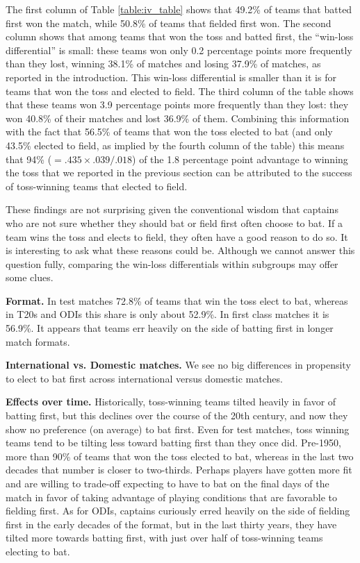 \documentclass[11pt,  letterpaper]{article}
\begin{document}
The first column of Table \ref{table:iv_table} shows that 49.2\% of teams that batted first won the match, while 50.8\% of teams that fielded first won. The second column shows that among teams that won the toss and batted first, the ``win-loss differential'' is small: these teams won only 0.2 percentage points more frequently than they lost, winning 38.1\% of matches and losing 37.9\% of matches, as reported in the introduction. This win-loss differential is smaller than it is for teams that won the toss and elected to field. The third column of the table shows that these teams won 3.9 percentage points more frequently than they lost: they won 40.8\% of their matches and lost 36.9\% of them. Combining this information with the fact that 56.5\% of teams that won the toss elected to bat (and only 43.5\% elected to field, as implied by the fourth column of the table) this means that 94\% ($= .435 \times .039/.018$) of the 1.8 percentage point advantage to winning the toss that we reported in the previous section can be attributed to the success of toss-winning teams that elected to field. 

These findings are not surprising given the conventional wisdom that captains who are not sure whether they should bat or field first often choose to bat. If a team wins the toss and elects to field, they often have a good reason to do so. It is interesting to ask what these reasons could be. Although we cannot answer this question fully, comparing  the win-loss differentials within subgroups may offer some clues. 

\textbf{Format.} In test matches 72.8\% of teams that win the toss elect to bat, whereas in T20s and ODIs this share is only about 52.9\%. In first class matches it is 56.9\%. It appears that teams err heavily on the side of batting first in longer match formats. 

\textbf{International vs. Domestic matches.} We see no big differences in propensity to elect to bat first across international versus domestic matches.

\textbf{Effects over time.} Historically, toss-winning teams tilted heavily in favor of batting first, but this declines over the course of the 20th century, and now they show no preference (on average) to  bat first. Even for test matches, toss winning teams tend to be tilting less toward batting first than they once did. Pre-1950, more than 90\% of teams that won the toss elected to bat, whereas in the last two decades that number is closer to two-thirds. Perhaps players have gotten more fit and are willing to trade-off expecting to have to bat on the final days of the match in favor of taking advantage of playing conditions that are favorable to fielding first. As for ODIs, captains curiously erred heavily on the side of fielding first in the early decades of the format, but in the last thirty years, they have tilted more towards batting first, with just over half of toss-winning teams electing to bat. 
\end{document}
